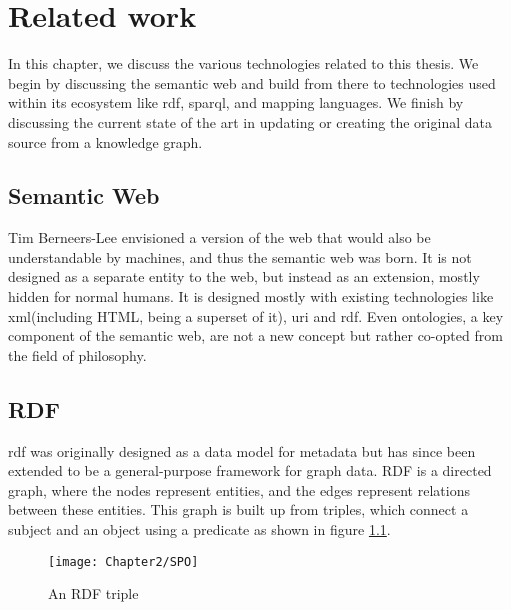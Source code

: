 
\chapter{Related work}
\label{chapter:related_work}

In this chapter, we discuss the various technologies related to this thesis. We begin by discussing the semantic web and build from there to technologies used within its ecosystem like \acrshort{rdf}, \acrshort{sparql}, and mapping languages. We finish by discussing the current state of the art in updating or creating the original data source from a knowledge graph. 

\section{Semantic Web}
Tim Berneers-Lee envisioned a version of the web that would also be understandable by machines, and thus the semantic web was born. It is not designed as a separate entity to the web, but instead as an extension, mostly hidden for normal humans. It is designed mostly with existing technologies like \acrshort{xml}(including HTML, being a superset of it), \acrshort{uri} and \acrshort{rdf}. Even ontologies, a key component of the semantic web, are not a new concept but rather co-opted from the field of philosophy. \citep{thesemanticweb}

\section{RDF}
\acrshort{rdf} was originally designed as a data model for metadata but has since been extended to be a general-purpose framework for graph data. RDF is a directed graph, where the nodes represent entities, and the edges represent relations between these entities. This graph is built up from triples, which connect a subject and an object using a predicate as shown in figure \ref{fig:rdf_triple}. 

\begin{figure}
    \centering
    \texttt{[image: Chapter2/SPO]}
    \caption{An RDF triple}
    \label{fig:rdf_triple}
\end{figure}

